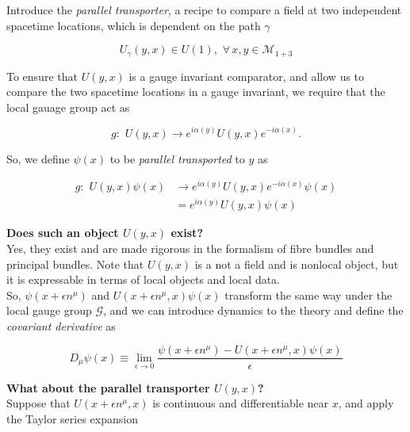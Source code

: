 \noindent Introduce the \textit{parallel transporter}, a recipe to compare a field at two independent spacetime locations, which is dependent on the path $\gamma$

\begin{equation}
U_\gamma (y,x) \in U(1), \,\, \forall \, x, y \in \mathcal{M}_{1+3}
\end{equation}

\noindent To ensure that $U(y,x)$ is a gauge invariant comparator, and allow us to compare the two spacetime locations in a gauge invariant, we require that the local gauage group act as

\begin{equation}
g: \,\, U(y,x) \rightarrow e^{i \alpha (y)} U(y,x) e^{-i \alpha(x)}.
\end{equation}

\noindent So, we define $\psi(x)$ to be \textit{parallel transported} to $y$ as

\begin{align}
g: \,\, U(y,x) \psi(x) &\rightarrow e^{i \alpha(y)} U(y,x) e^{-i \alpha(x) }\psi(x) \\
&= e^{i \alpha(y)} U(y,x)  \psi(x)
\end{align}

\noindent \textbf{Does such an object $U(y,x)$ exist?} \\

\noindent Yes, they exist and are made rigorous in the formalism of fibre bundles and principal bundles. Note that $U(y,x)$ is a not a field and is nonlocal object, but it is expressable in terms of local objects and local data. \\

\noindent So, $\psi(x + \epsilon n^\mu)$ and $U(x+\epsilon n^\mu, x)\psi(x)$ transform the same way under the local gauge group $\mathcal{G}$, and we can introduce dynamics to the theory and define the \textit{covariant derivative} as

\begin{equation}
D_\mu \psi (x) \equiv \lim_{\epsilon \rightarrow 0} \frac{\psi (x + \epsilon n^\mu) - U (x + \epsilon n^\mu, x) \psi (x)}{\epsilon}
\end{equation}

\noindent \textbf{What about the parallel transporter $U(y,x)$?} \\

\noindent Suppose that $U(x + \epsilon n^\mu , x)$ is continuous and differentiable near $x$, and apply the Taylor series expansion

